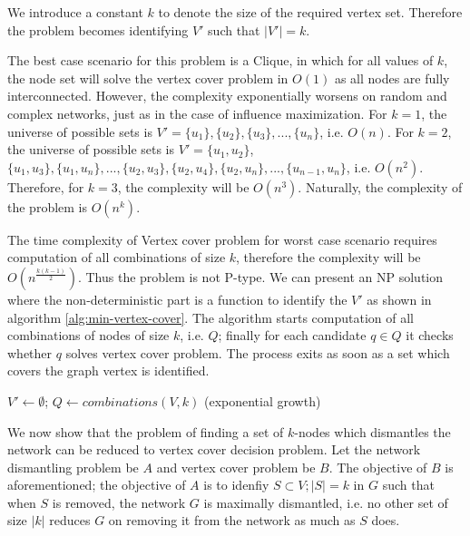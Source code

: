 	We introduce a constant $k$ to denote the size of the required vertex set. Therefore the problem becomes identifying $V'$ such that $|V'|=k$.
	
	The best case scenario for this problem is a Clique, in which for all values of $k$, the node set will solve the vertex cover problem in $O(1)$ as all nodes are fully interconnected. However, the complexity exponentially worsens on random and complex networks, just as in the case of influence maximization.
	For $k=1$, the universe of possible sets is $V'=\{u_1\},\{u_2\},\{u_3\},...,\{u_n\}$, i.e. $O(n)$.
	For $k=2$, the universe of possible sets is $V'=\{u_1,u_2\}$, $\{u_1,u_3\}, \{u_1,u_n\}, ..., \{u_2,u_3\}, \{u_2,u_4\}, \{u_2,u_n\}, ..., \{u_{n-1},u_n\}$, i.e. $O(n^2)$.
	Therefore, for $k=3$, the complexity will be $O(n^3)$. Naturally, the complexity of the problem is $O(n^k)$.
	
	The time complexity of Vertex cover problem for worst case scenario requires computation of all combinations of size $k$, therefore the complexity will be $O(n^{\frac{k(k-1)}{2}})$. Thus the problem is not P-type. We can present an NP solution where the non-deterministic part is a function to identify the $V'$ as shown in algorithm \ref{alg:min-vertex-cover}. The algorithm starts computation of all combinations of nodes of size $k$, i.e. $Q$; finally for each candidate $q\in Q$ it checks whether $q$ solves vertex cover problem. The process exits as soon as a set which covers the graph vertex is identified.
	
	\begin{algorithm}[h]
		\caption{Non-deterministic Polynomial time algorithm for minimum vertex cover problem}
		\label{alg:min-vertex-cover}
		\SetAlgoLined
		$V'\gets \emptyset$; $Q\gets combinations(V, k)$ (exponential growth)
		\newline
	\end{algorithm}

	We now show that the problem of finding a set of $k$-nodes which dismantles the network can be reduced to vertex cover decision problem. Let the network dismantling problem be $A$ and vertex cover problem be $B$. The objective of $B$ is aforementioned; the objective of $A$ is to idenfiy $S\subset V;|S|=k$ in $G$ such that when $S$ is removed, the network $G$ is maximally dismantled, i.e. no other set of size $|k|$ reduces $G$ on removing it from the network as much as $S$ does.
	
